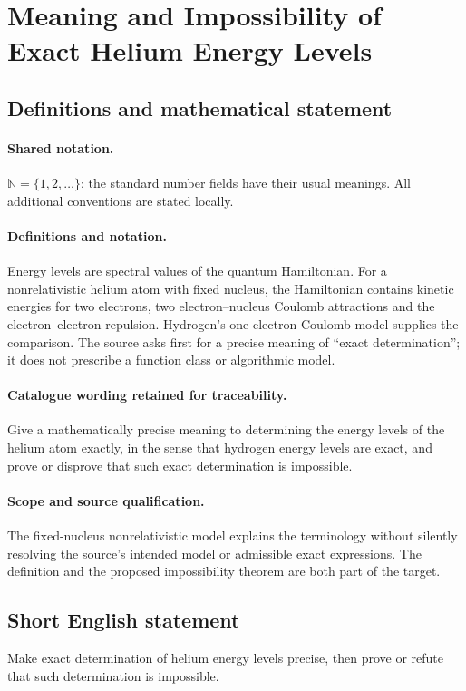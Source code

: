 \documentclass[11pt]{article}
\begin{document}
\section{Meaning and Impossibility of Exact Helium Energy Levels}\label{statement}

\subsection{Definitions and mathematical statement}

\paragraph{Shared notation.}$\mathbb N=\{1,2,\ldots\}$; the standard number fields have their usual meanings. All additional conventions are stated locally.


\paragraph{Definitions and notation.}Energy levels are spectral values of the quantum Hamiltonian. For a nonrelativistic helium atom with fixed nucleus, the Hamiltonian contains kinetic energies for two electrons, two electron--nucleus Coulomb attractions and the electron--electron repulsion. Hydrogen’s one-electron Coulomb model supplies the comparison. The source asks first for a precise meaning of ``exact determination''; it does not prescribe a function class or algorithmic model.

\paragraph{Catalogue wording retained for traceability.}
Give a mathematically precise meaning to determining the energy levels of the helium atom exactly, in the sense that hydrogen energy levels are exact, and prove or disprove that such exact determination is impossible.
\paragraph{Scope and source qualification.}The fixed-nucleus nonrelativistic model explains the terminology without silently resolving the source’s intended model or admissible exact expressions. The definition and the proposed impossibility theorem are both part of the target.
\subsection{Short English statement}
Make exact determination of helium energy levels precise, then prove or refute that such determination is impossible.
\end{document}
